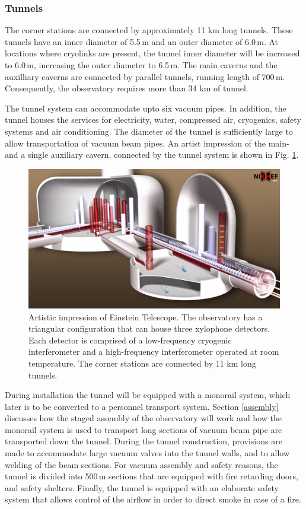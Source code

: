 \FloatBarrier
\subsubsection{Tunnels}
The corner stations are connected by approximately 11 km long tunnels. These tunnels have an inner diameter of 5.5\,m and an outer diameter of 6.0\,m. At locations where cryolinks are present, the tunnel inner diameter will be increased to 6.0\,m, increasing the outer diameter to 6.5\,m. The main caverns and the auxilliary caverns are connected by parallel tunnels, running length of 700\,m. Consequently, the observatory requires more than 34 km of tunnel.
  
The tunnel system can accommodate upto six vacuum pipes. In addition, the tunnel houses the services for electricity, water, compressed air, cryogenics, safety systems and air conditioning. The diameter of the tunnel is sufficiently large to allow transportation of vacuum beam pipes. An artist impression of the main- and a single auxiliary cavern, connected by the tunnel system is shown in Fig. \ref{infra}. 
\begin{figure}[h!]
	\centering
		\includegraphics[width=17cm]{./Sec_SiteInfra/Figures/ArtisticView1.jpg}
		\caption{Artistic impression of Einstein Telescope. The observatory has a triangular configuration that can house three xylophone detectors. Each detector is comprised of a low-frequency cryogenic interferometer and a high-frequency interferometer operated at room temperature. The corner stations are connected by 11 km long tunnels.}
		\label{infra}
\end{figure}
During installation the tunnel will be equipped with a monorail system, which later is to be converted to a personnel transport system. Section \ref{assembly} discusses how the staged assembly of the observatory will work and how the monorail system is used to transport long sections of vacuum beam pipe are transported down the tunnel. During the tunnel construction, provisions are made to accommodate large vacuum valves into the tunnel walls, and to allow welding of the beam sections. For vacuum assembly and safety reasons, the tunnel is divided into 500\,m sections that are equipped with fire retarding doors, and safety shelters. Finally, the tunnel is equipped with an elaborate safety system that allows control of the airflow in order to direct smoke in case of a fire.
